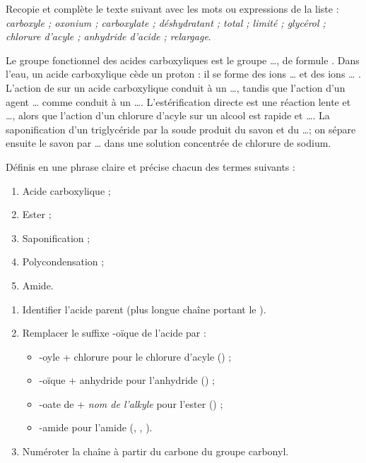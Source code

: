 \documentclass[11pt]{article}
\newcounter{popsec}
\newcounter{popsub}
\newcommand{\courssub}[1]{%
  \stepcounter{popsub}%
  \par\vspace{9pt}\noindent{\popxbold\fontsize{11.5}{13}\selectfont\color{popink}{\color{poporange}\thepopsec.\thepopsub}\hspace{6pt}#1}\par\nopagebreak\vspace{4pt}
}
\begin{document}
\begin{exercice}
Recopie et complète le texte suivant avec les mots ou expressions de la liste : \emph{carboxyle ; oxonium ; carboxylate ; déshydratant ; total ; limité ; glycérol ; chlorure d'acyle ; anhydride d'acide ; relargage}.

Le groupe fonctionnel des acides carboxyliques est le groupe \ldots, de formule . Dans l'eau, un acide carboxylique cède un proton : il se forme des ions \ldots{}  et des ions \ldots{} . L'action de  sur un acide carboxylique conduit à un \ldots, tandis que l'action d'un agent \ldots{} comme  conduit à un \ldots. L'estérification directe est une réaction lente et \ldots, alors que l'action d'un chlorure d'acyle sur un alcool est rapide et \ldots. La saponification d'un triglycéride par la soude produit du savon et du \ldots ; on sépare ensuite le savon par \ldots{} dans une solution concentrée de chlorure de sodium.
\end{exercice}

\begin{exercice}[Définitions]
Définis en une phrase claire et précise chacun des termes suivants :
\begin{enumerate}
\item Acide carboxylique ;
\item Ester ;
\item Saponification ;
\item Polycondensation ;
\item Amide.
\end{enumerate}
\end{exercice}

\courssub{Je m'entraîne}

\begin{methode}
\begin{enumerate}
\item Identifier l'acide parent (plus longue chaîne portant le ).
\item Remplacer le suffixe \og -oïque \fg{} de l'acide par :
  \begin{itemize}
  \item \og -oyle \fg{} + \og chlorure \fg{} pour le chlorure d'acyle () ;
  \item \og -oïque \fg{} + \og anhydride \fg{} pour l'anhydride () ;
  \item \og -oate de \fg{} + \emph{nom de l'alkyle} pour l'ester () ;
  \item \og -amide \fg{} pour l'amide (, , ).
  \end{itemize}
\item Numéroter la chaîne à partir du carbone du groupe carbonyl.
\end{enumerate}
\end{methode}
\end{document}
